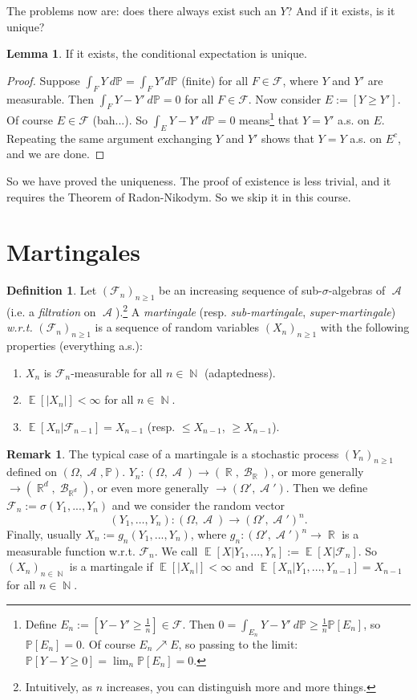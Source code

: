 \documentclass[12pt,a4paper]{report}
\theoremstyle{definition}
\newtheorem{lemma}[theorem]{Lemma}
\newtheorem{definition}[theorem]{Definition}
\newtheorem*{remark}{Remark}
\theoremstyle{num.custom-title}
\DeclareMathOperator{\A}{\mathcal{A}}
\DeclareMathOperator{\B}{\mathcal{B}}
\DeclareMathOperator{\E}{\mathbb{E}}
\DeclareMathOperator{\N}{\mathbb{N}}
\DeclareMathOperator{\R}{\mathbb{R}}
\newcommand{\F}{\mathcal{F}}
\renewcommand{\1}{\mathbbm{1}}
\renewcommand{\P}{\mathbb{P}}
\begin{document}
The problems now are: does there always exist such an $Y$? And if it exists, is it unique?

\begin{lemma}
If it exists, the conditional expectation is unique.
\begin{proof}
Suppose $\int_F Y \ d\P = \int_F Y' d\P$ (finite) for all $F \in \F$, where $Y$ and $Y'$ are measurable. Then $\int_F Y-Y' \ d\P =0$ for all $F \in \F$. Now consider $E := [Y \geq Y']$. Of course $E \in \F$ (bah...). So $\int_E Y-Y' \ d\P =0$ means\footnote{Define $E_n := [Y-Y' \geq \frac{1}{n}] \in \F$. Then $0=\int_{E_n} Y-Y' \ d\P \geq \frac{1}{n} \P[E_n]$, so $\P[E_n]=0$. Of course $E_n \nearrow E$, so passing to the limit: $\P[Y-Y \geq 0]=\lim_n \P[E_n]=0$.} that $Y=Y'$ a.s. on $E$. Repeating the same argument exchanging $Y$ and $Y'$ shows that $Y=Y$ a.s. on $E^c$, and we are done.
\end{proof}
\end{lemma}

So we have proved the uniqueness. The proof of existence is less trivial, and it requires the Theorem of Radon-Nikodym. So we skip it in this course.

\section{Martingales}

\begin{definition}
	Let $(\F_n)_{n \geq 1}$ be an increasing sequence of sub-$\sigma$-algebras of $\A$ (i.e. a \emph{filtration} on $\A$).\footnote{Intuitively, as $n$ increases, you can distinguish more and more things.} A \emph{martingale} (resp. \emph{sub-martingale}, \emph{super-martingale}) \emph{w.r.t.} $(\F_n)_{n \geq 1}$ is a sequence of random variables $(X_n)_{n \geq 1}$ with the following properties (everything a.s.):
	\begin{enumerate}
		\item $X_n$ is $\F_n$-measurable for all $n \in \N$ (adaptedness).
		\item $\E[|X_n|] < \infty$ for all $n \in \N$.
		\item $\E[X_n | \F_{n-1}] = X_{n-1}$ (resp. $\leq X_{n-1}$, $\geq X_{n-1}$).
	\end{enumerate}
\end{definition}

\begin{remark}
	The typical case of a martingale is a stochastic process $(Y_n)_{n \geq 1}$ defined on $(\Omega,\A,\P)$. $Y_n \colon (\Omega,\A) \to (\R,\B_{\R})$, or more generally $\to (\R^d,\B_{\R^d})$, or even more generally $\to (\Omega',\A')$. Then we define $\F_n := \sigma(Y_1,...,Y_n)$ and we consider the random vector
	\[
	(Y_1,\ldots,Y_n) \colon (\Omega,\A) \to (\Omega',\A')^n.
	\]
	Finally, usually $X_n := g_n(Y_1,...,Y_n)$, where $g_n \colon (\Omega',\A')^n \to \R$ is a measurable function w.r.t. $\F_n$. We call $\E[X|Y_1,...,Y_n] := \E[X|\F_n]$. So $(X_n)_{n \in \N}$ is a martingale if $\E[|X_n|] < \infty$ and $\E[X_n | Y_1,...,Y_{n-1}] = X_{n-1}$ for all $n \in \N$.
\end{remark}
\end{document}

